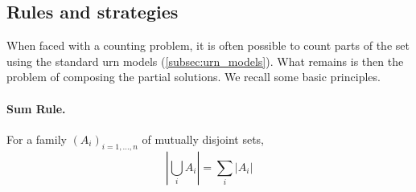 \subsection{Rules and strategies}
\label{subsec:rules_strategies}

When faced with a counting problem, it is often possible to count parts of the set using the standard urn models (\ref{subsec:urn_models}). 
What remains is then the problem of composing the partial solutions.
We recall some basic principles.

\paragraph{Sum Rule.} \label{par:sum_rule} 
For a family $(A_i)_{i=1,\dots,n}$ of mutually disjoint sets, 
  \[
  \left|\bigcup_i A_i\right| = \sum_i |A_i|
  \]

